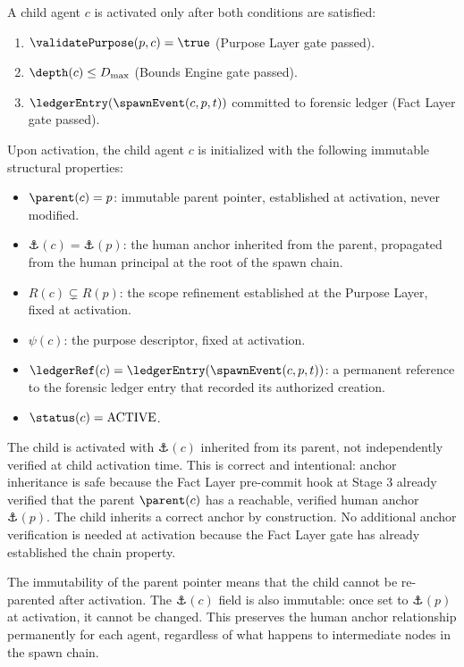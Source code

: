 A child agent $c$ is activated only after both conditions are satisfied:

\begin{enumerate}
    \item $\validatePurpose(p, c) = \true$ (Purpose Layer gate passed).
    \item $\depth(c) \leq D_{\max}$ (Bounds Engine gate passed).
    \item $\ledgerEntry(\spawnEvent(c, p, t))$ committed to forensic ledger (Fact Layer gate passed).
\end{enumerate}

Upon activation, the child agent $c$ is initialized with the following immutable structural properties:

\begin{itemize}
    \item $\parent(c) = p$: immutable parent pointer, established at activation, never modified.
    \item $\anchor(c) = \anchor(p)$: the human anchor inherited from the parent, propagated from the human principal at the root of the spawn chain.
    \item $R(c) \subsetneq R(p)$: the scope refinement established at the Purpose Layer, fixed at activation.
    \item $\psi(c)$: the purpose descriptor, fixed at activation.
    \item $\ledgerRef(c) = \ledgerEntry(\spawnEvent(c, p, t))$: a permanent reference to the forensic ledger entry that recorded its authorized creation.
    \item $\status(c) = \text{ACTIVE}$.
\end{itemize}

The child is activated with $\anchor(c)$ inherited from its parent, not independently verified at child activation time. This is correct and intentional: anchor inheritance is safe because the Fact Layer pre-commit hook at Stage 3 already verified that the parent $\parent(c)$ has a reachable, verified human anchor $\anchor(p)$. The child inherits a correct anchor by construction. No additional anchor verification is needed at activation because the Fact Layer gate has already established the chain property.

The immutability of the parent pointer means that the child cannot be re-parented after activation. The $\anchor(c)$ field is also immutable: once set to $\anchor(p)$ at activation, it cannot be changed. This preserves the human anchor relationship permanently for each agent, regardless of what happens to intermediate nodes in the spawn chain.

